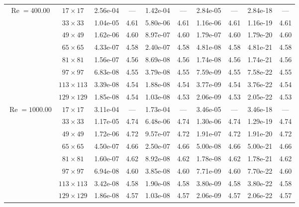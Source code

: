 \documentclass[preprint, 12pt]{elsarticle}
\begin{document}
{\begin{center}
\begin{table}[H]
{\begin{tabular*}{\textwidth}{@{\extracolsep\fill}cccccccccc@{}}
    \hline
    \multirow{7}{*}{$\operatorname{Re}=400.00$} & $17\times 17$ & 2.56e-04 & --- & 1.42e-04 & --- & 2.84e-05 & --- & 2.84e-18 & --- \\
    & $33\times 33$ & 1.04e-05 & 4.61 & 5.80e-06 & 4.61 & 1.16e-06 & 4.61 & 1.16e-19 & 4.61 \\
    & $49\times 49$ & 1.62e-06 & 4.60 & 8.97e-07 & 4.60 & 1.79e-07 & 4.60 & 1.79e-20 & 4.60 \\
    \multirow{3}{*}{$\operatorname{Wi}=10$} & $65\times 65$ & 4.33e-07 & 4.58 & 2.40e-07 & 4.58 & 4.81e-08 & 4.58 & 4.81e-21 & 4.58 \\
    & $81\times 81$ & 1.56e-07 & 4.56 & 8.69e-08 & 4.56 & 1.74e-08 & 4.56 & 1.74e-21 & 4.56 \\
    & $97\times 97$ & 6.83e-08 & 4.55 & 3.79e-08 & 4.55 & 7.59e-09 & 4.55 & 7.58e-22 & 4.55 \\
    & $113\times 113$ & 3.39e-08 & 4.54 & 1.88e-08 & 4.54 & 3.77e-09 & 4.54 & 3.76e-22 & 4.54 \\
    & $129\times 129$ & 1.85e-08 & 4.54 & 1.03e-08 & 4.53 & 2.06e-09 & 4.53 & 2.05e-22 & 4.53 \\
    \hline
    \multirow{7}{*}{$\operatorname{Re}=1000.00$} & $17\times 17$ & 3.11e-04 & --- & 1.73e-04 & --- & 3.46e-05 & --- & 3.46e-18 & --- \\
    & $33\times 33$ & 1.17e-05 & 4.74 & 6.48e-06 & 4.74 & 1.30e-06 & 4.74 & 1.29e-19 & 4.74 \\
    & $49\times 49$ & 1.72e-06 & 4.72 & 9.57e-07 & 4.72 & 1.91e-07 & 4.72 & 1.91e-20 & 4.72 \\
    \multirow{3}{*}{$\operatorname{Wi}=10$} & $65\times 65$ & 4.50e-07 & 4.66 & 2.50e-07 & 4.66 & 5.00e-08 & 4.66 & 5.00e-21 & 4.66 \\
    & $81\times 81$ & 1.60e-07 & 4.62 & 8.92e-08 & 4.62 & 1.78e-08 & 4.62 & 1.78e-21 & 4.62 \\
    & $97\times 97$ & 6.94e-08 & 4.60 & 3.85e-08 & 4.60 & 7.71e-09 & 4.60 & 7.70e-22 & 4.60 \\
    & $113\times 113$ & 3.42e-08 & 4.58 & 1.90e-08 & 4.58 & 3.80e-09 & 4.58 & 3.80e-22 & 4.58 \\
    & $129\times 129$ & 1.86e-08 & 4.57 & 1.03e-08 & 4.57 & 2.06e-09 & 4.57 & 2.06e-22 & 4.57 \\
    \hline
    \end{tabular*}
}
\end{table}
\end{center}
}

\end{document}
